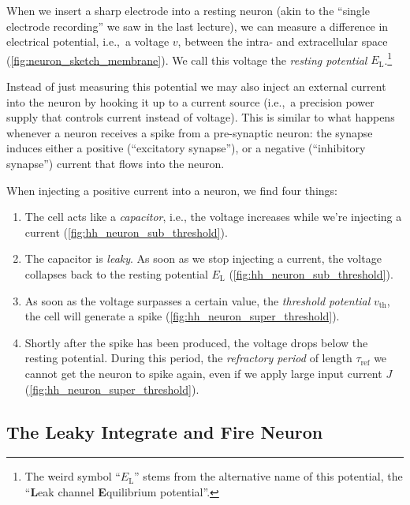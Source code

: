 \documentclass[10pt,letterpaper,oneside]{article}
\begin{document}
When we insert a sharp electrode into a resting neuron (akin to the \enquote{single electrode recording} we saw in the last lecture), we can measure a difference in electrical potential, i.e.,~a voltage $v$, between the intra- and extracellular space (\cref{fig:neuron_sketch_membrane}). We call this voltage the \emph{resting potential} $E_\mathrm{L}$.\footnote{The weird symbol \enquote{$E_\mathrm{L}$} stems from the alternative name of this potential, the \enquote{\textbf{L}eak channel \textbf{E}quilibrium potential}.}

Instead of just measuring this potential we may also inject an external current into the neuron by hooking it up to a current source (i.e.,~a precision power supply that controls current instead of voltage). This is similar to what happens whenever a neuron receives a spike from a pre-synaptic neuron: the synapse induces either a positive (\enquote{excitatory synapse}), or a negative (\enquote{inhibitory synapse}) current that flows into the neuron.

When injecting a positive current into a neuron, we find four things:
\begin{enumerate}
	\item The cell acts like a \emph{capacitor}, i.e., the voltage increases while we're injecting a current (\cref{fig:hh_neuron_sub_threshold}).
	\item The capacitor is \emph{leaky}. As soon as we stop injecting a current, the voltage collapses back to the resting potential $E_\mathrm{L}$ (\cref{fig:hh_neuron_sub_threshold}).
	\item As soon as the voltage surpasses a certain value, the \emph{threshold potential} $v_\mathrm{th}$, the cell will generate a spike (\cref{fig:hh_neuron_super_threshold}).
	\item Shortly after the spike has been produced, the voltage drops below the resting potential. During this period, the \emph{refractory period} of length $\tau_\mathrm{ref}$ we cannot get the neuron to spike again, even if we apply large input current $J$ (\cref{fig:hh_neuron_super_threshold}).
\end{enumerate}

\newpage
{}

\subsection{The Leaky Integrate and Fire Neuron}
\end{document}
